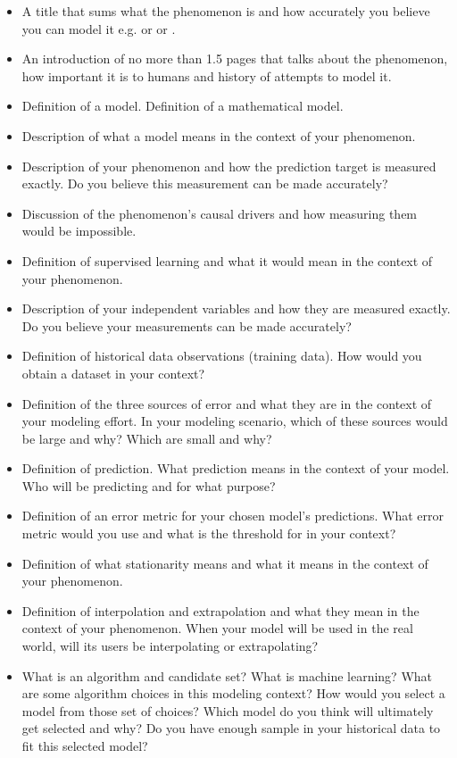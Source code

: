 \documentclass[12pt]{article}
\begin{document}
\begin{itemize}
\item A title that sums what the phenomenon is and how accurately you believe you can model it e.g.  or  or .
\item An introduction of no more than 1.5 pages that talks about the phenomenon, how important it is to humans and history of attempts to model it.
\item Definition of a model. Definition of a mathematical model.
\item Description of what a model means in the context of your phenomenon.
\item Description of your phenomenon and how the prediction target is measured exactly. Do you believe this measurement can be made accurately?
\item Discussion of the phenomenon's causal drivers and how measuring them would be impossible.
\item Definition of supervised learning and what it would mean in the context of your phenomenon.
\item Description of your independent variables and how they are measured exactly. Do you believe your measurements can be made accurately?
\item Definition of historical data observations (training data). How would you obtain a dataset in your context?
\item Definition of the three sources of error and what they are in the context of your modeling effort. In your modeling scenario, which of these sources would be large and why? Which are small and why?
\item Definition of prediction. What prediction means in the context of your model. Who will be predicting and for what purpose?
\item Definition of an error metric for your chosen model's predictions. What error metric would you use and what is the threshold for  in your context?
\item Definition of what stationarity means and what it means in the context of your phenomenon.
\item Definition of interpolation and extrapolation and what they mean in the context of your phenomenon. When your model will be used in the real world, will its users be interpolating or extrapolating?
\item What is an algorithm and candidate set? What is machine learning? What are some algorithm choices in this modeling context? How would you select a model from those set of choices? Which model do you think will ultimately get selected and why? Do you have enough sample in your historical data to fit this selected model?

\end{itemize}
\end{document}
